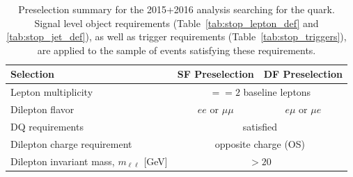 \begin{table}[!htb]
    \begin{center}
        \begin{tabular}{l|c| c}
            \hline
            \hline
            \textbf{Selection} & \textbf{SF Preselection} & \textbf{DF Preselection} \\
            \hline
            Lepton multiplicity & \multicolumn{2}{c}{$==2$ baseline leptons} \\
            Dilepton flavor & $ee$ or $\mu \mu$ & $e\mu$ or $\mu e$ \\
            DQ requirements & \multicolumn{2}{c}{satisfied} \\
            Dilepton charge requirement & \multicolumn{2}{c}{opposite charge (OS)} \\
            Dilepton invariant mass, $m_{\ell\ell}$ [GeV] & \multicolumn{2}{c}{$>20$} \\
            \hline
            \hline
        \end{tabular}
        \caption{
            Preselection summary for the 2015+2016 analysis searching for the \stopone quark.
            Signal level object requirements (Table~\ref{tab:stop_lepton_def} and \ref{tab:stop_jet_def}), as well as trigger requirements
            (Table~\ref{tab:stop_triggers}), are applied
            to the sample of events satisfying these requirements.
        }
        \label{tab:stop_preselection}
    \end{center}
\end{table}
